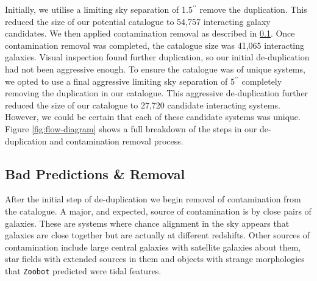Initially, we utilise a limiting sky separation of 1.5$^{\prime\prime}$ \DIFdelbegin {}\DIFdelend \DIFaddbegin {}\DIFaddend remove the duplication. This reduced the size of our potential catalogue to 54,757 interacting galaxy candidates. We then applied contamination removal as described in \DIFdelbegin {}\DIFdelend \DIFaddbegin {}\DIFaddend \ref{bad_pred}. Once contamination removal was completed, the catalogue size was 41,065 interacting galaxies. Visual inspection found further duplication, so our initial de-duplication had not been aggressive enough. To ensure the catalogue was of unique systems, we opted to use a final aggressive limiting sky separation of 5$^{\prime\prime}$  \DIFaddbegin {}\DIFaddend completely removing the duplication in our catalogue. This aggressive de-duplication further reduced the size of our catalogue to 27,720 candidate interacting systems. However, we could be certain that each of these candidate systems was unique. Figure \ref{fig:flow-diagram} shows a full breakdown of the steps in our de-duplication and contamination removal process.

\subsection{Bad Predictions \& Removal}\label{bad_pred}
\noindent After the initial step of de-duplication we begin removal of contamination from the catalogue. A major, and expected, source of contamination is by close pairs of galaxies. These are systems where chance alignment in the sky appears that galaxies are close together but are actually at different redshifts. Other sources of contamination include large central galaxies with satellite galaxies about them, star fields with extended sources in them and objects with strange morphologies that \texttt{Zoobot} predicted were tidal features.

